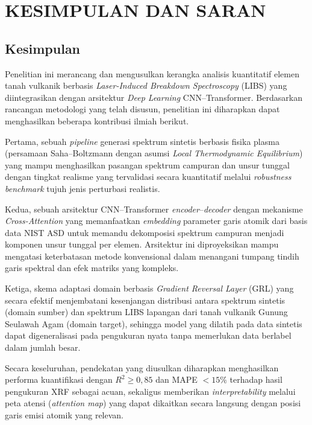 
\chapter{KESIMPULAN DAN SARAN}

\section{Kesimpulan}

Penelitian ini merancang dan mengusulkan kerangka analisis kuantitatif elemen tanah vulkanik berbasis \textit{Laser-Induced Breakdown Spectroscopy} (LIBS) yang diintegrasikan dengan arsitektur \textit{Deep Learning} CNN--Transformer. Berdasarkan rancangan metodologi yang telah disusun, penelitian ini diharapkan dapat menghasilkan beberapa kontribusi ilmiah berikut.

Pertama, sebuah \textit{pipeline} generasi spektrum sintetis berbasis fisika plasma (persamaan Saha--Boltzmann dengan asumsi \textit{Local Thermodynamic Equilibrium}) yang mampu menghasilkan pasangan spektrum campuran dan unsur tunggal dengan tingkat realisme yang tervalidasi secara kuantitatif melalui \textit{robustness benchmark} tujuh jenis perturbasi realistis.

Kedua, sebuah arsitektur CNN--Transformer \textit{encoder}--\textit{decoder} dengan mekanisme \textit{Cross-Attention} yang memanfaatkan \textit{embedding} parameter garis atomik dari basis data NIST ASD untuk memandu dekomposisi spektrum campuran menjadi komponen unsur tunggal per elemen. Arsitektur ini diproyeksikan mampu mengatasi keterbatasan metode konvensional dalam menangani tumpang tindih garis spektral dan efek matriks yang kompleks.

Ketiga, skema adaptasi domain berbasis \textit{Gradient Reversal Layer} (GRL) yang secara efektif menjembatani kesenjangan distribusi antara spektrum sintetis (domain sumber) dan spektrum LIBS lapangan dari tanah vulkanik Gunung Seulawah Agam (domain target), sehingga model yang dilatih pada data sintetis dapat digeneralisasi pada pengukuran nyata tanpa memerlukan data berlabel dalam jumlah besar.

Secara keseluruhan, pendekatan yang diusulkan diharapkan menghasilkan performa kuantifikasi dengan $R^2 \geq 0{,}85$ dan MAPE $< 15\%$ terhadap hasil pengukuran XRF sebagai acuan, sekaligus memberikan \textit{interpretability} melalui peta atensi (\textit{attention map}) yang dapat dikaitkan secara langsung dengan posisi garis emisi atomik yang relevan.

